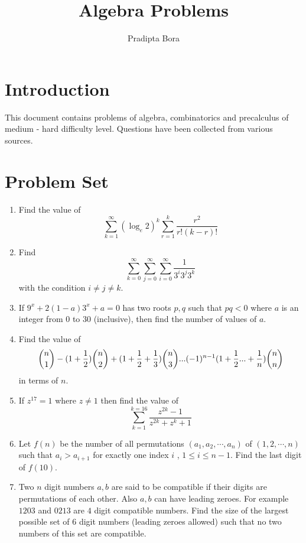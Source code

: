 \documentclass[a4paper]{article}
\title{Algebra Problems}
\author{Pradipta Bora}
\begin{document}
\maketitle


\section{Introduction}

This document contains problems of algebra, combinatorics and precalculus of medium - hard difficulty level. Questions have been collected from various sources.

\section{Problem Set}

\begin{enumerate}
\item Find the value of $$ \sum_{k=1}^{\infty} (\log_e 2)^k \sum_{r=1}^k \frac {r^2}{r!(k-r)!} $$

\item Find $$ \sum_{k=0}^{\infty} \sum_{j=0}^{\infty} \sum_{i=0}^{\infty} \frac{1}{3^i3^j3^k}$$ with the condition $ i\neq j \neq k$.

\item If $ 9^x + 2(1-a) 3^x + a = 0 $ has two roots $p, q$ such that $pq < 0$ where $a$ is an
integer from $0$ to $30$ (inclusive), then find the number of values of $a$.

\item Find the value of $$ \dbinom{n}{1} - (1 + \frac{1}{2})\dbinom{n}{2} + (1 + \frac{1}{2} + \frac{1}{3})\dbinom{n}{3}... (-1)^{n-1}(1 + \frac{1}{2} ... + \frac{1}{n})\dbinom{n}{n}$$ in terms of $n$. 

\item If $z^{17} = 1$ where $ z \neq 1$ then find the value of $$ \sum_{k=1}^{k=16} \frac{z^{2k} - 1}{z^{2k} + z^{k} + 1} $$

\item Let $f(n)$ be the number of all permutations $(a_1,a_2, \cdots , a_n)$ of $(1,2, \cdots ,n)$ such that $a_i > a_{i+1} $ for exactly one index $i$ , $ 1 \le i \le n-1$. Find the last digit of $f(10)$.
\item Two $n$ digit numbers $a, b$ are said to be compatible if their digits are permutations of each other. Also $a, b$ can have leading zeroes. For example $1203$ and $0213$ are $4$ digit compatible numbers. Find the size of the largest possible set of $6$ digit numbers (leading zeroes allowed) such that no two numbers of this set are compatible.


\end{enumerate}
\end{document}
